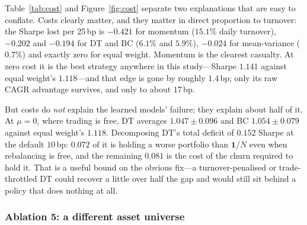 \documentclass[11pt]{article}
\begin{document}
Table~\ref{tab:cost} and Figure~\ref{fig:cost} separate two explanations that are easy to
conflate. Costs clearly matter, and they matter in direct proportion to turnover: the Sharpe
lost per 25\,bp is $-0.421$ for momentum ($15.1\%$ daily turnover), $-0.202$ and $-0.194$ for DT
and BC ($6.1\%$ and $5.9\%$), $-0.024$ for mean-variance ($0.7\%$) and exactly zero for equal
weight. Momentum is the clearest casualty. At zero cost it is the best strategy anywhere in this
study---Sharpe $1.141$ against equal weight's $1.118$---and that edge is gone by roughly
$1.4$\,bp; only its raw CAGR advantage survives, and only to about $17$\,bp.

But costs do \emph{not} explain the learned models' failure; they explain about half of it. At
$\mu = 0$, where trading is free, DT averages $1.047 \pm 0.096$ and BC $1.054 \pm 0.079$ against
equal weight's $1.118$. Decomposing DT's total deficit of $0.152$ Sharpe at the default
$10$\,bp: $0.072$ of it is holding a worse portfolio than $\mathbf{1}/N$ even when rebalancing
is free, and the remaining $0.081$ is the cost of the churn required to hold it. That is a
useful bound on the obvious fix---a turnover-penalised or trade-throttled DT could recover a
little over half the gap and would still sit behind a policy that does nothing at all.

\subsubsection{Ablation 5: a different asset universe}
\label{sec:universeb}
\end{document}
